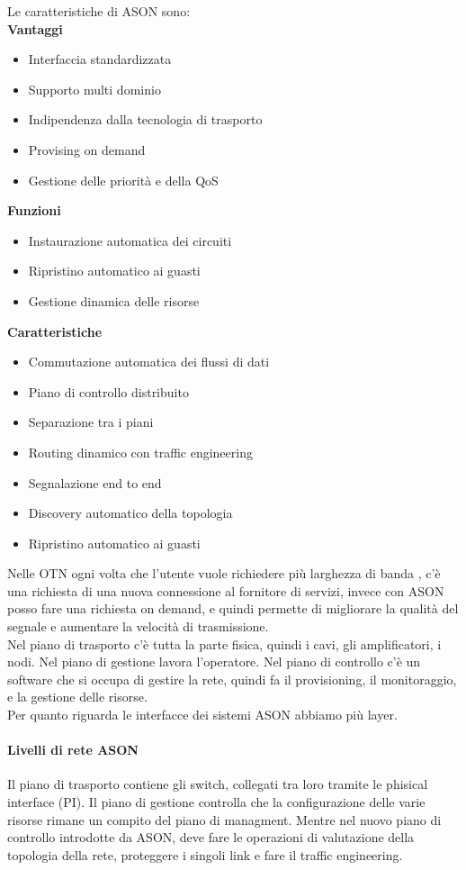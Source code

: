 Le caratteristiche di ASON sono:\\
\textbf{Vantaggi}
\begin{itemize}
    \item Interfaccia standardizzata
    \item Supporto multi dominio
    \item Indipendenza dalla tecnologia di trasporto
    \item Provising on demand
    \item Gestione delle priorità e della QoS
\end{itemize}
\textbf{Funzioni}
\begin{itemize}
    \item Instaurazione automatica dei circuiti
    \item Ripristino automatico ai guasti
    \item Gestione dinamica delle risorse
\end{itemize}
\textbf{Caratteristiche}
\begin{itemize}
    \item Commutazione automatica dei flussi di dati
    \item Piano di controllo distribuito
    \item Separazione tra i piani
    \item Routing dinamico con traffic engineering
    \item Segnalazione end to end
    \item Discovery automatico della topologia
    \item Ripristino automatico ai guasti
\end{itemize}

Nelle OTN ogni volta che l'utente vuole richiedere più larghezza di banda , c'è una richiesta di una nuova connessione al fornitore di servizi, invece con ASON posso fare una richiesta on demand, e quindi permette di migliorare la qualità del segnale e aumentare la velocità di trasmissione.\\

Nel piano di trasporto c'è tutta la parte fisica, quindi i cavi, gli amplificatori, i nodi. Nel piano di gestione lavora l'operatore. Nel piano di controllo c'è un software che si occupa di gestire la rete, quindi fa il provisioning, il monitoraggio, e la gestione delle risorse.\\

Per quanto riguarda le interfacce dei sistemi ASON abbiamo più layer. 

\paragraph{Livelli di rete ASON}
Il piano di trasporto contiene gli switch, collegati tra loro tramite le phisical interface (PI).
Il piano di gestione controlla che la configurazione delle varie risorse rimane un compito del piano di managment. Mentre nel nuovo piano di controllo introdotte da ASON, deve fare le operazioni di valutazione della topologia della rete, proteggere i singoli link e fare il traffic engineering.\\

